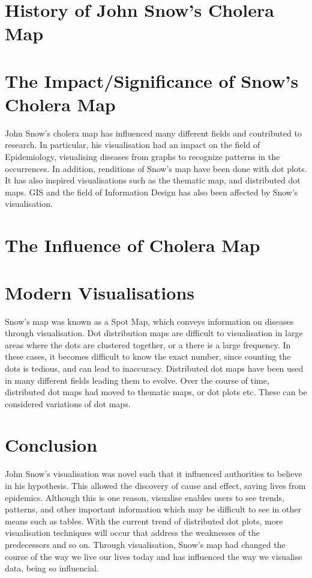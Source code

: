 \documentclass[12pt]{article}
\begin{document}
\section{History of John Snow's Cholera Map}





\section{The Impact/Significance of Snow's Cholera Map}
John Snow's cholera map has influenced many different fields and contributed to research. In particular, his visualisation had an impact on the field of Epidemiology, visualising diseases from graphs to recognize patterns in the occurrences. In addition, renditions of Snow's map have been done with dot plots. It has also inspired visualisations such as the thematic map, and distributed dot maps. GIS and the field of Information Design has also been affected by Snow's visualisation. 

\section{The Influence of Cholera Map}

\section{Modern Visualisations}
Snow's map was known as a Spot Map, which conveys information on diseases through visualisation. Dot distribution maps are difficult to visualisation in large areas where the dots are clustered together, or a there is a large frequency. In these cases, it becomes difficult to know the exact number, since counting the dots is tedious, and can lead to inaccuracy. Distributed dot maps have been used in many different fields leading them to evolve. Over the course of time, distributed dot maps had moved to thematic maps, or dot plots etc. These can be considered variations of dot maps. 

\section{Conclusion}
John Snow's visualisation was novel such that it influenced authorities to believe in his hypothesis. This allowed the discovery of cause and effect, saving lives from epidemics. Although this is one reason, visualise enables users to see trends, patterns, and other important information which may be difficult to see in other means such as tables. With the current trend of distributed dot plots, more visualisation techniques will occur that address the weaknesses of the predecessors and so on. Through visualisation, Snow's map had changed the course of the way we live our lives today and has influenced the way we visualise data, being so influencial.

% 
% 




\end{document}
